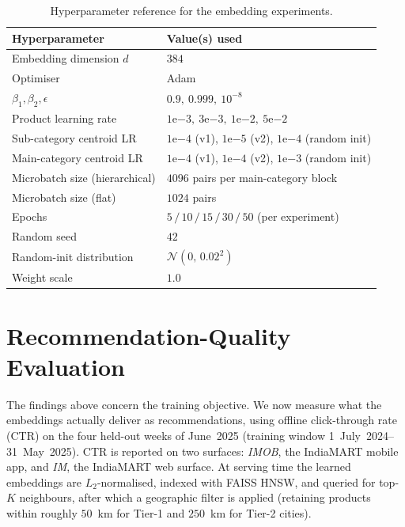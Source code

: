 \begin{table}[ht]
  \centering
  \caption{Hyperparameter reference for the embedding experiments.}
  \label{tab:emb-hparams}
  \begin{tabular}{ll}
    \toprule
    Hyperparameter & Value(s) used \\
    \midrule
    Embedding dimension $d$          & $384$ \\
    Optimiser                        & Adam \\
    $\beta_1,\beta_2,\epsilon$       & $0.9,\ 0.999,\ 10^{-8}$ \\
    Product learning rate            & $1\mathrm{e}{-3},\ 3\mathrm{e}{-3},\ 1\mathrm{e}{-2},\ 5\mathrm{e}{-2}$ \\
    Sub-category centroid LR         & $1\mathrm{e}{-4}$ (v1), $1\mathrm{e}{-5}$ (v2), $1\mathrm{e}{-4}$ (random init) \\
    Main-category centroid LR        & $1\mathrm{e}{-4}$ (v1), $1\mathrm{e}{-4}$ (v2), $1\mathrm{e}{-3}$ (random init) \\
    Microbatch size (hierarchical)   & $4096$ pairs per main-category block \\
    Microbatch size (flat)           & $1024$ pairs \\
    Epochs                           & $5\,/\,10\,/\,15\,/\,30\,/\,50$ (per experiment) \\
    Random seed                      & $42$ \\
    Random-init distribution         & $\mathcal{N}(0,\,0.02^2)$ \\
    Weight scale                     & $1.0$ \\
    \bottomrule
  \end{tabular}
\end{table}

\section{Recommendation-Quality Evaluation}
\label{sec:emb-ctr}

The findings above concern the training objective. We now measure what the
embeddings actually deliver as recommendations, using offline click-through
rate (CTR) on the four held-out weeks of June~2025 (training window
1~July~2024--31~May~2025). CTR is reported on two surfaces: \emph{IMOB}, the
IndiaMART mobile app, and \emph{IM}, the IndiaMART web surface. At serving time
the learned embeddings are $L_2$-normalised, indexed with FAISS HNSW, and
queried for top-$K$ neighbours, after which a geographic filter is applied
(retaining products within roughly $50$~km for Tier-1 and $250$~km for Tier-2
cities).

